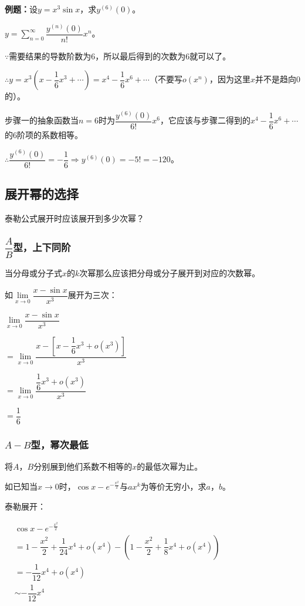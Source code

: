 \documentclass[UTF8, 12pt]{ctexart}
\begin{document}
\textbf{例题：}设$y=x^3\sin x$，求$y^{(6)}(0)$。\medskip

$y=\sum_{n=0}^\infty\dfrac{y^{(n)}(0)}{n!}x^n$。\medskip

$\because$需要结果的导数阶数为6，所以最后得到的次数为6就可以了。\medskip

$\therefore y=x^3\left(x-\dfrac{1}{6}x^3+\cdots\right)=x^4-\dfrac{1}{6}x^6+\cdots$（不要写$o(x^n)$，因为这里$x$并不是趋向0的）。

步骤一的抽象函数当$n=6$时为$\dfrac{y^{(6)}(0)}{6!}x^6$，它应该与步骤二得到的$x^4-\dfrac{1}{6}x^6+\cdots$的6阶项的系数相等。

$\therefore \dfrac{y^{(6)}(0)}{6!}=-\dfrac{1}{6}\Rightarrow y^{(6)}(0)=-5!=-120$。

\subsection{展开幂的选择}

泰勒公式展开时应该展开到多少次幂？

\subsubsection{\texorpdfstring{$\dfrac{A}{B}$}\ 型，上下同阶}

当分母或分子式$x$的$k$次幂那么应该把分母或分子展开到对应的次数幂。\medskip

如$\lim\limits_{x\to 0}\dfrac{x-\sin x}{x^3}$展开为三次：\medskip

$\lim\limits_{x\to 0}\dfrac{x-\sin x}{x^3}$

$=\lim\limits_{x\to 0}\dfrac{x-\left[x-\dfrac{1}{6}x^3+o(x^3)\right]}{x^3}$\medskip

$=\lim\limits_{x\to 0}\dfrac{\dfrac{1}{6}x^3+o(x^3)}{x^3}$\medskip

$=\dfrac{1}{6}$

\subsubsection{\texorpdfstring{$A-B$}\ 型，幂次最低}

将$A$，$B$分别展到他们系数不相等的$x$的最低次幂为止。

如已知当$x\to 0$时，$\cos x-e^{-\frac{x^2}{2}}$与$ax^k$为等价无穷小，求$a$，$b$。

泰勒展开：

$
\begin{aligned}
    & \cos x-e^{-\frac{x^2}{2}} \\
    & = 1-\dfrac{x^2}{2}+\dfrac{1}{24}x^4+o(x^4)-\left(1-\dfrac{x^2}{2}+\dfrac{1}{8}x^4+o(x^4)\right) \\
    & = -\dfrac{1}{12}x^4+o(x^4) \\
    & \sim -\dfrac{1}{12}x^4
\end{aligned}
$
\end{document}
